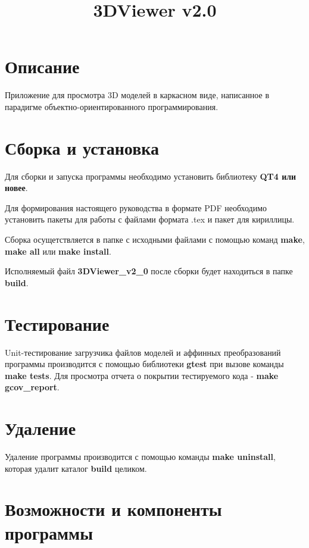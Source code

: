 \documentclass[12pt, a4paper]{article}
\title{3DViewer v2.0}
\date{}
\begin{document}
\maketitle
\tableofcontents

\pagebreak


\section*{Описание}

Приложение для просмотра 3D моделей в каркасном виде, написанное в парадигме объектно-ориентированного программирования.


\section{Сборка и установка}

Для сборки и запуска программы необходимо установить библиотеку \textbf{QT4 или новее}.

Для формирования настоящего руководства в формате PDF необходимо установить пакеты для работы с файлами формата .tex и пакет для кириллицы.

Сборка осущетствляется в папке с исходными файлами с помощью команд \textbf{make}, \textbf{make all} или \textbf{make install}.

Исполняемый файл \textbf{3DViewer\_v2\_0} после сборки будет находиться в папке \textbf{build}.


\section{Тестирование}

Unit-тестирование загрузчика файлов моделей и аффинных преобразований программы производится с помощью библиотеки \textbf{gtest} при вызове команды \textbf{make tests}.
Для просмотра отчета о покрытии тестируемого кода - \textbf{make gcov\_report}.


\section{Удаление}
Удаление программы производится с помощью команды \textbf{make uninstall}, которая удалит каталог \textbf{build} целиком.


\section{Возможности и компоненты программы}
\end{document}
